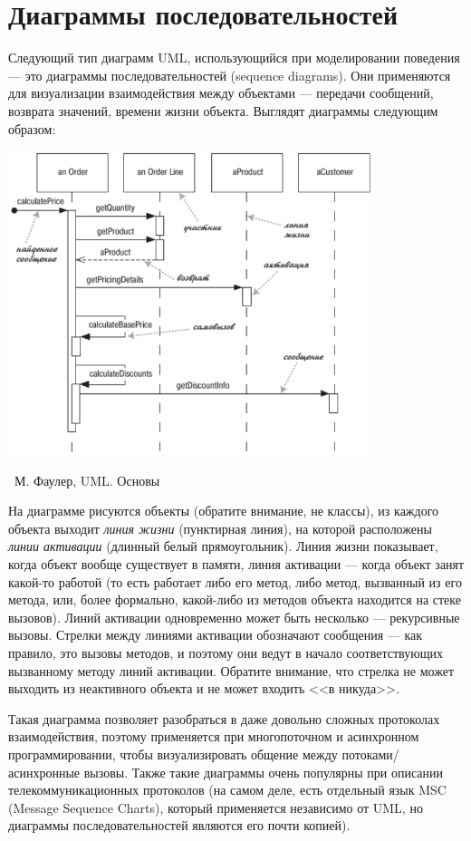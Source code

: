 \documentclass[a5paper]{article}
\newcommand{\attribution}[1] {
    \vspace{-5mm}\begin{flushright}\begin{scriptsize}%
    {\textcopyright\, #1}\end{scriptsize}\end{flushright}
}
\begin{document}
\section{Диаграммы последовательностей}

Следующий тип диаграмм UML, использующийся при моделировании поведения --- это диаграммы последовательностей (sequence diagrams). Они применяются для визуализации взаимодействия между объектами --- передачи сообщений, возврата значений, времени жизни объекта. Выглядят диаграммы следующим образом:

\begin{center}
    \includegraphics[width=0.8\textwidth]{sequenceDiagram.png}
    \attribution{М. Фаулер, UML. Основы}
\end{center}

На диаграмме рисуются объекты (обратите внимание, не классы), из каждого объекта выходит \textit{линия жизни} (пунктирная линия), на которой расположены \textit{линии активации} (длинный белый прямоугольник). Линия жизни показывает, когда объект вообще существует в памяти, линия активации --- когда объект занят какой-то работой (то есть работает либо его метод, либо метод, вызванный из его метода, или, более формально, какой-либо из методов объекта находится на стеке вызовов). Линий активации одновременно может быть несколько --- рекурсивные вызовы. Стрелки между линиями активации обозначают сообщения --- как правило, это вызовы методов, и поэтому они ведут в начало соответствующих вызванному методу линий активации. Обратите внимание, что стрелка не может выходить из неактивного объекта и не может входить <<в никуда>>.

Такая диаграмма позволяет разобраться в даже довольно сложных протоколах взаимодействия, поэтому применяется при многопоточном и асинхронном программировании, чтобы визуализировать общение между потоками/асинхронные вызовы. Также такие диаграммы очень популярны при описании телекоммуникационных протоколов (на самом деле, есть отдельный язык MSC (Message Sequence Charts), который применяется независимо от UML, но диаграммы последовательностей являются его почти копией).
\end{document}
